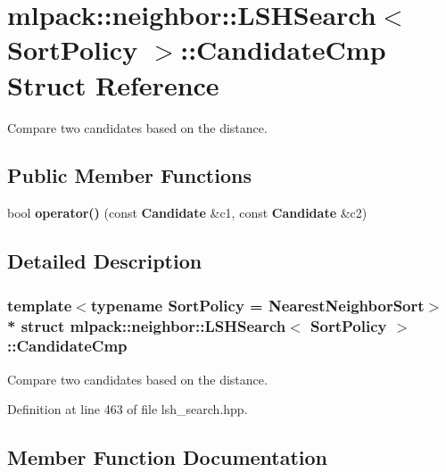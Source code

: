 \section{mlpack\+:\+:neighbor\+:\+:L\+S\+H\+Search$<$ Sort\+Policy $>$\+:\+:Candidate\+Cmp Struct Reference}
\label{structmlpack_1_1neighbor_1_1LSHSearch_1_1CandidateCmp}


Compare two candidates based on the distance.  


\subsection*{Public Member Functions}
\begin{DoxyCompactItemize}
\item 
bool {\bf operator()} (const {\bf Candidate} \&c1, const {\bf Candidate} \&c2)
\end{DoxyCompactItemize}


\subsection{Detailed Description}
\subsubsection*{template$<$typename Sort\+Policy = Nearest\+Neighbor\+Sort$>$\\*
struct mlpack\+::neighbor\+::\+L\+S\+H\+Search$<$ Sort\+Policy $>$\+::\+Candidate\+Cmp}

Compare two candidates based on the distance. 

Definition at line 463 of file lsh\+\_\+search.\+hpp.



\subsection{Member Function Documentation}
